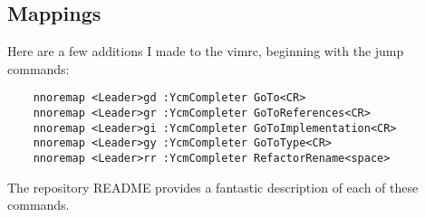 \subsection{Mappings}
Here are a few additions I made to the vimrc, beginning with the jump commands:
\begin{lstlisting}
    nnoremap <Leader>gd :YcmCompleter GoTo<CR>
    nnoremap <Leader>gr :YcmCompleter GoToReferences<CR>
    nnoremap <Leader>gi :YcmCompleter GoToImplementation<CR>
    nnoremap <Leader>gy :YcmCompleter GoToType<CR>
    nnoremap <Leader>rr :YcmCompleter RefactorRename<space>
\end{lstlisting}
The repository README provides a fantastic description of each of these
commands.\\

